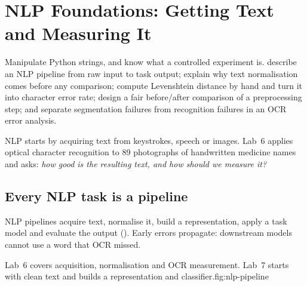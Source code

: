 \chapter{NLP Foundations: Getting Text and Measuring It}
\label{ch:nlp-foundations}

\chapterguide%
  {Manipulate Python strings, and know what a controlled experiment is.}
  {describe an NLP pipeline from raw input to task output; explain why text normalisation comes before any comparison; compute Levenshtein distance by hand and turn it into character error rate; design a fair before/after comparison of a preprocessing step; and separate segmentation failures from recognition failures in an OCR error analysis.}

NLP starts by acquiring text from keystrokes, speech or images. Lab~6 applies optical character recognition to 89 photographs of handwritten medicine names and asks: \emph{how good is the resulting text, and how should we measure it?}

\section{Every NLP task is a pipeline}

NLP pipelines acquire text, normalise it, build a representation, apply a task model and evaluate the output (). Early errors propagate: downstream models cannot use a word that OCR missed.

\begin{utpfig}{Lab~6 covers acquisition, normalisation and OCR measurement. Lab~7 starts with clean text and builds a representation and classifier.}{fig:nlp-pipeline}
\end{utpfig}

